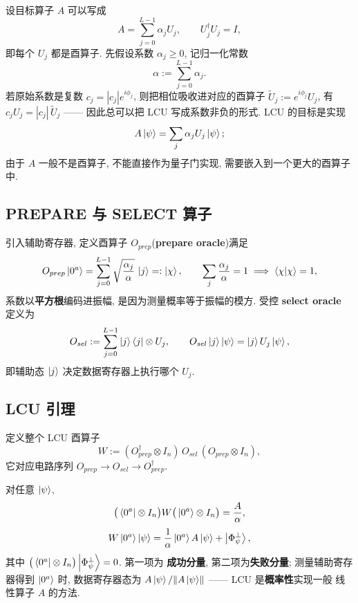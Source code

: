 \documentclass[utf8]{article} %
\numberwithin{equation}{section}   %
\newtheorem{Thm}{\hskip 2em {\color{blue} 定理}}[subsection]
\begin{document}
设目标算子 $A$ 可以写成
\begin{equation}
    A = \sum_{j=0}^{L-1} \alpha_j U_j,
    \qquad U_j^\dagger U_j = I,
\end{equation}
即每个 $U_j$ 都是酉算子. 先假设系数 $\alpha_j \ge 0$, 记归一化常数
\begin{equation}
    \alpha := \sum_{j=0}^{L-1} \alpha_j.
\end{equation}
若原始系数是复数 $c_j = |c_j| e^{i\phi_j}$, 则把相位吸收进对应的酉算子
$\widetilde U_j := e^{i\phi_j} U_j$, 有 $c_j U_j = |c_j|\,\widetilde U_j$ ——
因此总可以把 LCU 写成系数非负的形式. LCU 的目标是实现
\begin{equation}
    A\ket{\psi} = \sum_j \alpha_j U_j \ket{\psi};
\end{equation}
由于 $A$ 一般不是酉算子, 不能直接作为量子门实现, 需要嵌入到一个更大的酉算子中.

\subsection{PREPARE 与 SELECT 算子}

引入辅助寄存器, 定义酉算子 $O_{prep}$(\textbf{prepare oracle})满足
\begin{equation}
    O_{prep}\ket{0^a} = \sum_{j=0}^{L-1} \sqrt{\frac{\alpha_j}{\alpha}}\,\ket{j}
    =: \ket{\chi},
    \qquad
    \sum_j \frac{\alpha_j}{\alpha} = 1
    \;\Longrightarrow\; \langle\chi|\chi\rangle = 1,
\end{equation}
系数以\textbf{平方根}编码进振幅, 是因为测量概率等于振幅的模方. 受控
\textbf{select oracle} 定义为
\begin{equation}
    O_{sel} := \sum_{j=0}^{L-1} \ket{j}\bra{j} \otimes U_j,
    \qquad
    O_{sel}\ket{j}\ket{\psi} = \ket{j} U_j \ket{\psi},
\end{equation}
即辅助态 $\ket{j}$ 决定数据寄存器上执行哪个 $U_j$.

\subsection{LCU 引理}

定义整个 LCU 酉算子
\begin{equation}
    W := (O_{prep}^\dagger \otimes I_n)\, O_{sel}\, (O_{prep} \otimes I_n),
\end{equation}
它对应电路序列 $O_{prep} \to O_{sel} \to O_{prep}^\dagger$.

\begin{Thm}[LCU 引理] \label{thm:lcu}
    对任意 $\ket{\psi}$,
    \begin{equation}
        \big(\bra{0^a}\otimes I_n\big) W \big(\ket{0^a}\otimes I_n\big) = \frac{A}{\alpha},
    \end{equation}
    \begin{equation}
        W \ket{0^a}\ket{\psi} = \frac{1}{\alpha}\ket{0^a} A \ket{\psi} + \ket{\Phi_\psi^\perp},
    \end{equation}
    其中 $\big(\bra{0^a}\otimes I_n\big)\ket{\Phi_\psi^\perp} = 0$. 第一项为
    \textbf{成功分量}, 第二项为\textbf{失败分量}; 测量辅助寄存器得到 $\ket{0^a}$ 时,
    数据寄存器态为 $A\ket{\psi}/\norm{A\ket{\psi}}$ —— LCU 是\textbf{概率性}实现一般
    线性算子 $A$ 的方法.
\end{Thm}
\end{document}
